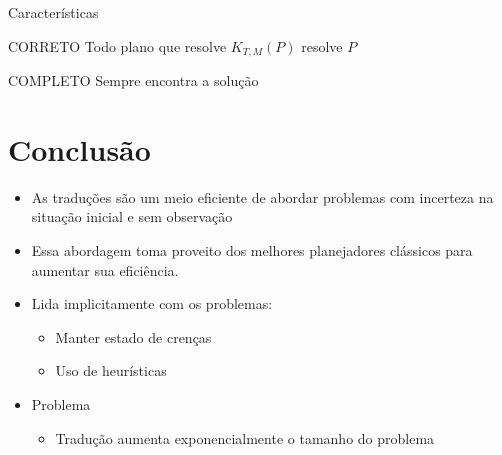 \begin{frame}{Características}
    \begin{block}{CORRETO}
        Todo plano que resolve $K_{T,M}(P)$ resolve $P$
    \end{block}
    \begin{block}{COMPLETO}
        Sempre encontra a solução
    \end{block}
    
    
\end{frame}

\section{Conclusão}
\begin{frame}
    \begin{itemize}
        \item As traduções são um meio eficiente de abordar problemas com incerteza na situação inicial e sem observação
        \item Essa abordagem toma proveito dos melhores planejadores clássicos para aumentar sua eficiência.
        \item Lida implicitamente com os problemas:
        \begin{itemize}
            \item Manter estado de crenças
            \item Uso de heurísticas
        \end{itemize}
        
        \item Problema
        \begin{itemize}
            \item \alert{Tradução aumenta exponencialmente o tamanho do problema}  
        \end{itemize}
    \end{itemize}
\end{frame} 
